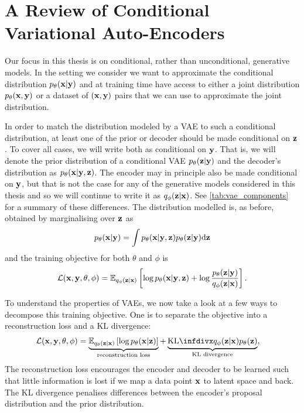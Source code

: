 \section{A Review of Conditional Variational Auto-Encoders}
\label{sec:conditional-vae}

Our focus in this thesis is on conditional, rather than unconditional, generative models. In the setting we consider we want to approximate the conditional distribution $p_\theta({\mathbf{x}}|{\mathbf{y}})$ and at training time have access to either a joint distribution $p_\theta({\mathbf{x}},{\mathbf{y}})$ or a dataset of $({\mathbf{x}}, {\mathbf{y}})$ pairs that we can use to approximate the joint distribution.

In order to match the distribution modeled by a VAE to such a conditional distribution, at least one of the prior or decoder should be made conditional on ${\mathbf{z}}$. To cover all cases, we will write both as conditional on ${\mathbf{y}}$. That is, we will denote the prior distribution of a conditional VAE $p_\theta({\mathbf{z}}|{\mathbf{y}})$ and the decoder's distribution as $p_\theta({\mathbf{x}}|{\mathbf{y}},{\mathbf{z}})$. The encoder may in principle also be made conditional on ${\mathbf{y}}$, but that is not the case for any of the generative models considered in this thesis and so we will continue to write it as $q_\phi({\mathbf{z}}|{\mathbf{x}})$. See \cref{tab:vae_components} for a summary of these differences. The distribution modelled is, as before, obtained by marginalising over ${\mathbf{z}}$ as
\begin{equation} \label{eq:vae-marginal}
p_\theta({\mathbf{x}}|{\mathbf{y}}) = \int p_\theta({\mathbf{x}}|{\mathbf{y}},{\mathbf{z}})p_\theta({\mathbf{z}}|{\mathbf{y}}) \mathrm{d}{\mathbf{z}}
\end{equation}
and the training objective for both $\theta$ and $\phi$ is
\begin{equation}
    {\mathcal{L}}({\mathbf{x}}, {\mathbf{y}}, \theta, \phi) = \mathbb{E}_{q_\phi({\mathbf{z}}|{\mathbf{x}})} \left[ \log p_\theta({\mathbf{x}}|{\mathbf{y}},{\mathbf{z}}) + \log \frac{p_\theta({\mathbf{z}}|{\mathbf{y}})}{q_\phi({\mathbf{z}}|{\mathbf{x}})} \right].
\end{equation}

To understand the properties of VAEs, we now take a look at a few ways to decompose this training objective. One is to separate the objective into a reconstruction loss and a KL divergence:
\begin{align}
    \gL(\rvx, \rvy, \theta, \phi) &= \underbrace{\EX_{q_\theta(\rvz|\rvx)} \left[ \log p_\theta(\rvx|\rvz) \right]}_\text{reconstruction loss} + \underbrace{\kl{q_\phi(\rvz|\rvx)}{p_\theta(\rvz)}}_\text{KL divergence},
\label{eq:marginal-is}
\end{align}
The reconstruction loss encourages the encoder and decoder to be learned such that little information is lost if we map a data point ${\mathbf{x}}$ to latent space and back. The KL divergence penalises differences between the encoder's proposal distribution and the prior distribution.

